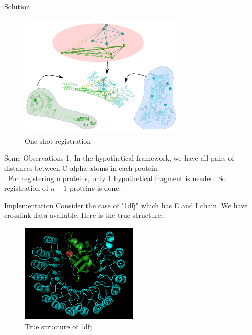 \begin{frame}{Solution}
    \begin{figure}
        \centering
        \includegraphics[width=0.7\textwidth]{images/final.png}
        \caption{One shot registration}
        \label{fig:my_label}
    \end{figure}
\end{frame}

\begin{frame}{Some Observations}
    1. In the hypothetical framework, we have all pairs of distances between C-alpha atoms in each protein. \\
    . For registering n proteins, only 1 hypothetical fragment is needed. So registration of $n+1$ proteins is done. \\
\end{frame}

\begin{frame}{Implementation}
    Consider the case of "1dfj" which has E and I chain. We have crosslink data available. Here is the true structure:

    \begin{figure}
        \centering
        \includegraphics[width=0.5\textwidth]{images/1dfj_1.png}
        \caption{True structure of 1dfj}
        \label{fig:my_label}
    \end{figure}
    
\end{frame}

